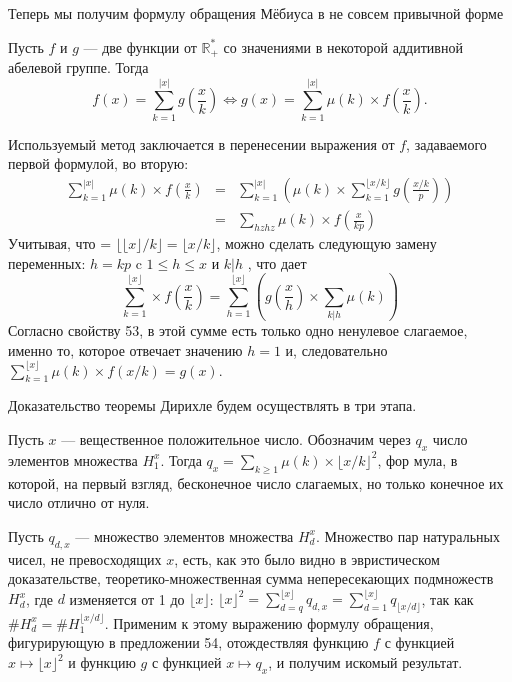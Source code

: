 Теперь мы получим формулу обращения Мёбиуса в не совсем при­вычной форме

\begin{predl}
Пусть $f$ и $g$ — две функции от $\mathbb{R}_{+}^{*}$ со значениями в некоторой ад­дитивной абелевой группе. Тогда
$$f(x)=\sum\limits_{k=1}^{|x|} g\left(\frac{x}{k}\right) \Longleftrightarrow g(x)=\sum\limits_{k=1}^{|x|}\mu(k)\times f\left(\frac{x}{k}\right).$$
\end{predl}
\begin{myproof}
Используемый метод заключается в перенесении выражения от $f$,
задаваемого первой формулой, во вторую:
$$\begin{array}{rcc}
\sum\limits_{k=1}^{|x|}\mu(k)\times f\left(\frac{x}{k}\right)&=&\sum\limits_{k=1}^{|x|}\left(\mu(k)\times\sum\limits_{k=1}^{\lfloor x/k \rfloor} g\left(\frac{x/k}{p}\right)\right)\\
&=&\sum\limits_{hzhz}\mu(k)\times f\left(\frac{x}{kp}\right)
\end{array}$$
Учитывая, что = $\lfloor\lfloor x \rfloor/k\rfloor = \lfloor x/k\rfloor$, можно сделать следующую замену
переменных: $h=kp$ c $1\leqslant h\leqslant x$ и $k|h$ , что дает
\newpage
$$\sum\limits_{k=1}^{\lfloor x \rfloor}\times f\left(\frac{x}{k}\right)=\sum_{h=1}^{\lfloor x\rfloor}\left( g\left(\frac{x}{h}\right)\times\sum\limits_{k|h}\mu(k)\right)$$
Согласно свойству 53, в этой сумме есть только одно ненулевое слагаемое, именно то, которое отвечает значению $h=1$ и, следовательно $\sum\nolimits_{k=1}^{\lfloor x\rfloor}\mu(k)\times f(x/k)=g(x)$.
\end{myproof}
Доказательство теоремы Дирихле будем осуществлять в три этапа.
\begin{lemma}
\hspace*{0.5cm}Пусть $x$ — вещественное положительное число. Обозначим через $q_{x}$
число элементов множества $H_{1}^x$. Тогда $q_{x}=\sum\nolimits_{k\geqslant 1}\mu(k)\times\lfloor x/k\rfloor^2$, фор­
мула, в которой, на первый взгляд, бесконечное число слагаемых, но
только конечное их число отлично от нуля.
\end{lemma}
\begin{myproof}
Пусть $q_{d,x}$ — множество элементов множества $H_{d}^x$. Множество пар
натуральных чисел, не превосходящих $x$, есть, как это было видно
в эвристическом доказательстве, теоретико-множественная сумма
непересекающих подмножеств $H_{d}^x$, где $d$ изменяется от 1 до $\lfloor x\rfloor$: $\lfloor x\rfloor^2=\sum\nolimits_{d=q}^{\lfloor x\rfloor}q_{d,x}=\sum\nolimits_{d=1}^{\lfloor x\rfloor}q_{\lfloor x/d\rfloor}$, так как $\#H_{d}^x=\#H_{1}^{\lfloor x/d\rfloor}$. Применим к этому выражению формулу обращения, фигурирующую в
предложении 54, отождествляя функцию $f$ с функцией $x\mapsto\lfloor x\rfloor^2$
 и функцию $g$ с функцией $x\mapsto q_{x}$, и получим искомый результат.
\end{myproof}

